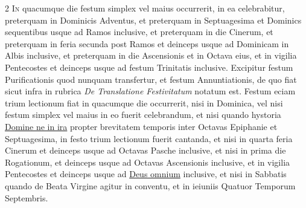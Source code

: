 \begin{multicols*}{2}
{\color{Red} }
\lettrine[lines=2]{\zallmancaps \color{Red} I}{n} quacumque die festum simplex vel maius occurrerit, in ea celebrabitur, preterquam in Dominicis Adventus, et preterquam in Septuagesima et Dominics sequentibus usque ad Ramos inclusive, et preterquam in die Cinerum, et preterquam in feria secunda post Ramos et deinceps usque ad Dominicam in Albis inclusive, et preterquam in die Ascensionis et in Octava eius, et in vigilia Pentecostes et deinceps usque ad festum Trinitatis inclusive. Excipitur festum Purificationis quod nunquam transfertur, et festum Annuntiationis, de quo fiat sicut infra in rubrica \textit{De Translatione Festivitatum} notatum est.
Festum eciam trium lectionum fiat in quacumque die occurrerit, nisi in Dominica, vel nisi festum simplex vel maius in eo fuerit celebrandum, et nisi quando hystoria \hyperlink{domine-ne-in-ira}{Domine ne in ira} propter brevitatem temporis inter Octavas Epiphanie et Septuagesima, in festo trium lectionum fuerit cantanda, et nisi in quarta feria Cinerum et deinceps usque ad Octavas Pasche inclusive, et nisi in prima die Rogationum, et deinceps usque ad Octavas Ascensionis inclusive, et in vigilia Pentecostes et deinceps usque ad \hyperlink{deus-omnium}{Deus omnium} inclusive, et nisi in Sabbatis quando de Beata Virgine agitur in conventu, et in ieiuniis Quatuor Temporum Septembris.


\end{multicols*}

